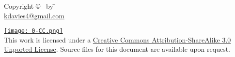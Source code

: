 \begin{publication}
 
\begin{tabbing}
Copyright \copyright\ \makeatletter{\@copyrightyear} by \=\makeatletter{\@author}\\
\>\href{mailto:kdavies4@gmail.com}{kdavies4@gmail.com}
\end{tabbing}

\noindent
\href{http://creativecommons.org/licenses/by-sa/3.0/}{\texttt{[image: 0-CC.png]}}\\

\noindent
This work is licensed under a \href{http://creativecommons.org/licenses/by-sa/3.0/}{Creative Commons Attribution-ShareAlike 3.0 Unported License}.  Source files for this document are available upon request.
\end{publication}
